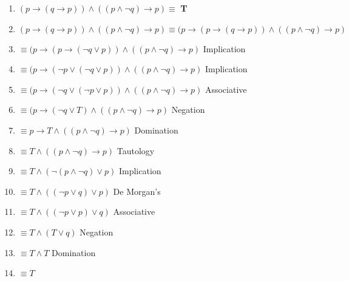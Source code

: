 \documentclass[11pt]{article}
\begin{document}
\begin{enumerate}
\begin{enumerate}[label=\alph*., itemsep=0mm]
\item $(p \rightarrow (q \rightarrow p)) \wedge ((p \wedge \neg q) \rightarrow p) \equiv$ 
{\bf T}
\item $(p \rightarrow (q \rightarrow p)) \wedge ((p \wedge \neg q) \rightarrow p) \equiv (p \rightarrow (p \rightarrow (q \rightarrow p)) \wedge ((p \wedge \neg q) \rightarrow p)  $ 
\item \hspace{5.55cm}$ \equiv (p \rightarrow (p \rightarrow (\neg q \vee  p)) \wedge ((p \wedge \neg q) \rightarrow p)  $ Implication
\item \hspace{5.55cm}$ \equiv (p \rightarrow (\neg p \vee (\neg q \vee p)) \wedge ((p \wedge \neg q) \rightarrow p)  $ Implication
\item \hspace{5.55cm}$ \equiv (p \rightarrow (\neg q \vee (\neg p \vee p)) \wedge ((p \wedge \neg q) \rightarrow p)  $ Associative
\item \hspace{5.55cm}$ \equiv (p \rightarrow (\neg q \vee T) \wedge ((p \wedge \neg q) \rightarrow p)  $ Negation
\item \hspace{5.55cm}$ \equiv p \rightarrow T \wedge ((p \wedge \neg q) \rightarrow p)  $ Domination
\item \hspace{5.55cm}$ \equiv T \wedge ((p \wedge \neg q) \rightarrow p)  $ Tautology
\item \hspace{5.55cm}$ \equiv T \wedge (\neg(p \wedge \neg q) \vee p)  $ Implication
\item \hspace{5.55cm}$ \equiv T \wedge ((\neg p \vee q) \vee p)  $ De Morgan's
\item \hspace{5.55cm}$ \equiv T \wedge ((\neg p \vee p) \vee q)  $ Associative
\item \hspace{5.55cm}$ \equiv T \wedge (T \vee q)  $ Negation
\item \hspace{5.55cm}$ \equiv T \wedge T  $ Domination
\item \hspace{5.55cm}$ \equiv T  $ 
\end{enumerate}


\end{enumerate}
\end{document}
